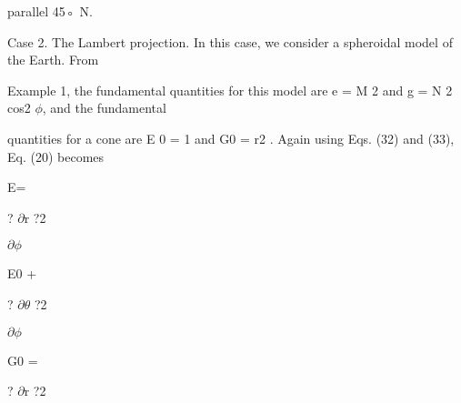 \documentclass[a4paper,portrait,12pt]{article}
\begin{document}
\begin{flushleft}
parallel 45◦ N.
\end{flushleft}


\begin{flushleft}
Case 2. The Lambert projection. In this case, we consider a spheroidal model of the Earth. From
\end{flushleft}


\begin{flushleft}
Example 1, the fundamental quantities for this model are e = M 2 and g = N 2 cos2 $\phi$, and the fundamental
\end{flushleft}


\begin{flushleft}
quantities for a cone are E 0 = 1 and G0 = r2 . Again using Eqs. (32) and (33), Eq. (20) becomes
\end{flushleft}


\begin{flushleft}
E=
\end{flushleft}





\begin{flushleft}
? $\partial$r ?2
\end{flushleft}


\begin{flushleft}
$\partial$$\phi$
\end{flushleft}





\begin{flushleft}
E0 +
\end{flushleft}





\begin{flushleft}
? $\partial$$\theta$ ?2
\end{flushleft}


\begin{flushleft}
$\partial$$\phi$
\end{flushleft}





\begin{flushleft}
G0 =
\end{flushleft}





\begin{flushleft}
? $\partial$r ?2
\end{flushleft}
\end{document}
